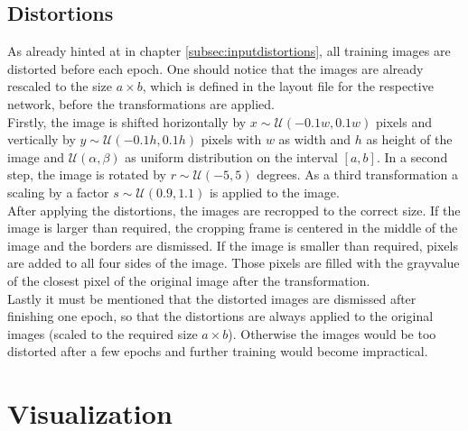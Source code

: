 \documentclass[11pt, a4paper]{article}
\newcommand\closedInt[2]{\left[#1,#2\right]}
\begin{document}
\begin{appendix}
	\subsection{Distortions}
	\label{sec:implementation-distortions}
	As already hinted at in chapter \ref{subsec:inputdistortions}, all training images are distorted before each epoch.
	One should notice that the images are already rescaled to the size $a \times b$, which is defined in the layout file for the respective network, before the transformations are applied.\\
	Firstly, the image is shifted horizontally by $x \sim \mathcal{U}(- 0.1 w, 0.1 w)$ pixels and vertically by $y \sim \mathcal{U}(- 0.1 h, 0.1 h)$ pixels with $w$ as width and $h$ as height of the image and $\mathcal{U}(\alpha,\beta)$ as uniform distribution on the interval $\closedInt{a}{b}$. In a second step, the image is rotated by $r \sim \mathcal{U}(-5, 5)$ degrees. As a third transformation a scaling by a factor $s \sim \mathcal{U}(0.9,1.1)$ is applied to the image.\\
	After applying the distortions, the images are recropped to the correct size. If the image is larger than required, the cropping frame is centered in the middle of the image and the borders are dismissed. If the image is smaller than required, pixels are added to all four sides of the image. Those pixels are filled with the grayvalue of the closest pixel of the original image after the transformation.\\
	Lastly it must be mentioned that the distorted images are dismissed after finishing one epoch, so that the distortions are always applied to the original images (scaled to the required size $a \times b$). Otherwise the images would be too distorted after a few epochs and further training would become impractical.
	
	\section{Visualization}
\end{appendix}

{}

\end{document}
